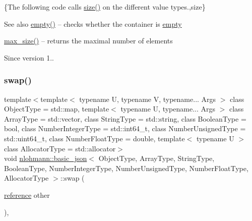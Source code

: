 \{The following code calls {\ttfamily \hyperlink{classnlohmann_1_1basic__json_a0ea8a1ecca4b3cb0ba09ad7552c364b6}{size()}} on the different value types.,size\}

\begin{DoxySeeAlso}{See also}
\hyperlink{classnlohmann_1_1basic__json_ae3fe0423252e171973cdd5786d036e30}{empty()} -- checks whether the container is \hyperlink{classnlohmann_1_1basic__json_ae3fe0423252e171973cdd5786d036e30}{empty} 

\hyperlink{classnlohmann_1_1basic__json_a7936417b875b7ec737f77ef84bbf7871}{max\+\_\+size()} -- returns the maximal number of elements
\end{DoxySeeAlso}
\begin{DoxySince}{Since}
version 1.. 
\end{DoxySince}
\hypertarget{classnlohmann_1_1basic__json_a2f774129440c427253dc97406e2d9010}{}\label{classnlohmann_1_1basic__json_a2f774129440c427253dc97406e2d9010} 
\subsubsection{\texorpdfstring{swap()}{swap()}\hspace{0.1cm}{\footnotesize\ttfamily [1/4]}}
{\footnotesize\ttfamily template$<$template$<$ typename U, typename V, typename... Args $>$ class Object\+Type = std\+::map, template$<$ typename U, typename... Args $>$ class Array\+Type = std\+::vector, class String\+Type  = std\+::string, class Boolean\+Type  = bool, class Number\+Integer\+Type  = std\+::int64\+\_\+t, class Number\+Unsigned\+Type  = std\+::uint64\+\_\+t, class Number\+Float\+Type  = double, template$<$ typename U $>$ class Allocator\+Type = std\+::allocator$>$ \\
void \hyperlink{classnlohmann_1_1basic__json}{nlohmann\+::basic\+\_\+json}$<$ Object\+Type, Array\+Type, String\+Type, Boolean\+Type, Number\+Integer\+Type, Number\+Unsigned\+Type, Number\+Float\+Type, Allocator\+Type $>$\+::swap (\begin{DoxyParamCaption}\item[{\hyperlink{classnlohmann_1_1basic__json_a3ec8e17be8732fe436e9d6733f52b7a3}{reference}}]{other }\end{DoxyParamCaption})\hspace{0.3cm}{\ttfamily [inline]}, {\ttfamily [noexcept]}}



